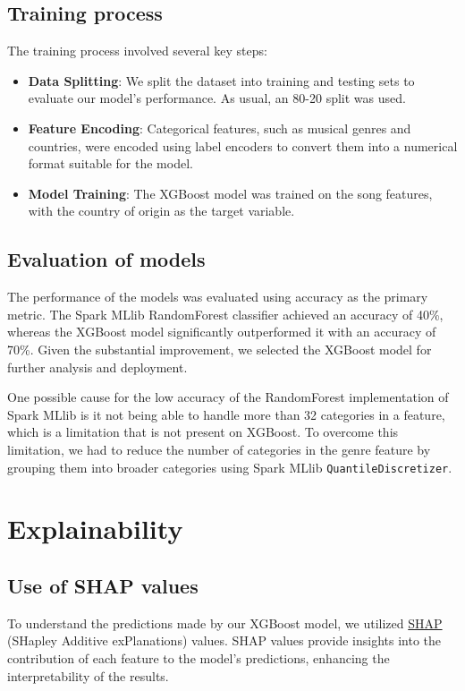\documentclass{article}
\begin{document}
\subsection{Training process}
The training process involved several key steps:
\begin{itemize}
    \item \textbf{Data Splitting}: We split the dataset into training and testing sets to evaluate our model's performance. As usual, an 80-20 split was used.
    \item \textbf{Feature Encoding}: Categorical features, such as musical genres and countries, were encoded using label encoders to convert them into a numerical format suitable for the model.
    \item \textbf{Model Training}: The XGBoost model was trained on the song features, with the country of origin as the target variable.
\end{itemize}

\subsection{Evaluation of models}
The performance of the models was evaluated using accuracy as the primary metric. The Spark MLlib RandomForest classifier achieved an accuracy of 40\%, whereas the XGBoost model significantly outperformed it with an accuracy of 70\%. Given the substantial improvement, we selected the XGBoost model for further analysis and deployment.\newline

One possible cause for the low accuracy of the RandomForest implementation of Spark MLlib is it not being able to handle more than 32 categories in a feature, which is a limitation that is not present on XGBoost. To overcome this limitation, we had to reduce the number of categories in the genre feature by grouping them into broader categories using Spark MLlib \texttt{QuantileDiscretizer}.

\section{Explainability}

\subsection{Use of SHAP values}
To understand the predictions made by our XGBoost model, we utilized \href{https://christophm.github.io/interpretable-ml-book/shap.html}{SHAP} (SHapley Additive exPlanations) values. SHAP values provide insights into the contribution of each feature to the model's predictions, enhancing the interpretability of the results.
\end{document}

